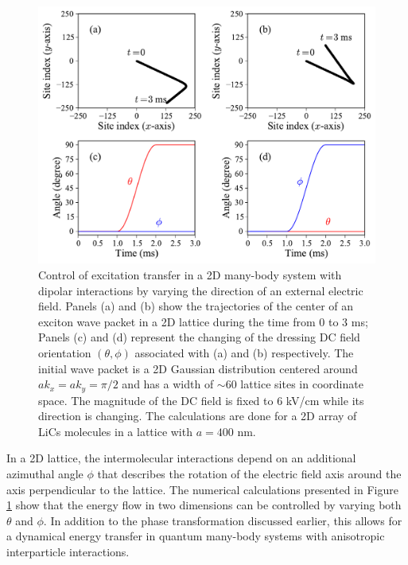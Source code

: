 \begin{figure}[htbp]
\centering
\includegraphics[width=\linewidth]{control-2d-wavepacket.pdf}
\caption{ Control of excitation transfer in a 2D many-body system with dipolar interactions by varying the 
direction of an external electric field.
Panels (a) and (b) show the trajectories of the center of an exciton wave packet in a 2D lattice during
 the time from 0 to 3 ms; Panels (c) and (d) represent the changing of the dressing DC field orientation $(\theta, \phi)$ associated with (a) and
(b) respectively. The initial wave packet is a 2D Gaussian distribution centered around $ak_x=ak_y=\pi/2$ and has a width of $\sim$60 lattice sites in coordinate space. The magnitude of the DC field is fixed to
6 kV/cm while its direction is changing. The calculations are done for a 2D array of  LiCs molecules in a lattice with
$a=400$ nm.
 }
\label{control-2d-wavepacket}
\end{figure}

In a 2D lattice, the intermolecular interactions depend on an additional azimuthal angle $\phi$ that describes
 the rotation of the electric field axis around the axis perpendicular to the lattice. The numerical calculations 
presented in Figure \ref{control-2d-wavepacket} show that the energy flow in two dimensions can be  
controlled by varying both $\theta$ and $\phi$. 
In addition to the phase transformation discussed earlier, this allows for a dynamical energy transfer in quantum 
many-body systems with anisotropic interparticle interactions.

